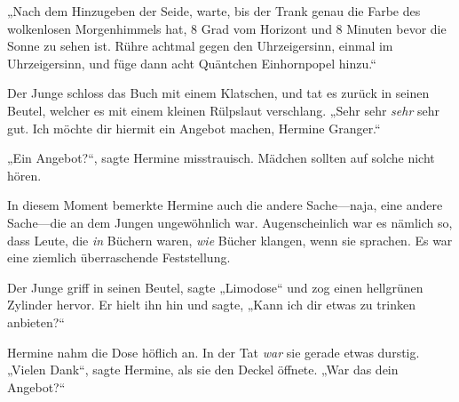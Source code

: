 „Nach dem Hinzugeben der Seide, warte, bis der Trank genau die Farbe des wolkenlosen Morgenhimmels hat, 8 Grad vom Horizont und 8 Minuten bevor die Sonne zu sehen ist. Rühre achtmal gegen den Uhrzeigersinn, einmal im Uhrzeigersinn, und füge dann acht Quäntchen Einhornpopel hinzu.“

Der Junge schloss das Buch mit einem Klatschen, und tat es zurück in seinen Beutel, welcher es mit einem kleinen Rülpslaut verschlang. „Sehr sehr \emph{sehr} sehr gut. Ich möchte dir hiermit ein Angebot machen, Hermine Granger.“

„Ein Angebot?“, sagte Hermine misstrauisch. Mädchen sollten auf solche nicht hören.

In diesem Moment bemerkte Hermine auch die andere Sache—naja, eine andere Sache—die an dem Jungen ungewöhnlich war. Augenscheinlich war es nämlich so, dass Leute, die \emph{in} Büchern waren, \emph{wie} Bücher klangen, wenn sie sprachen. Es war eine ziemlich überraschende Feststellung.

Der Junge griff in seinen Beutel, sagte „Limodose“ und zog einen hellgrünen Zylinder hervor. Er hielt ihn hin und sagte, „Kann ich dir etwas zu trinken anbieten?“

Hermine nahm die Dose höflich an. In der Tat \emph{war} sie gerade etwas durstig. „Vielen Dank“, sagte Hermine, als sie den Deckel öffnete. „War das dein Angebot?“

